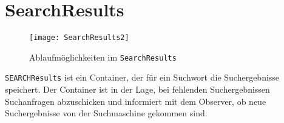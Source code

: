 
\section{SearchResults}
\begin{figure}[htb]
  \centering
  \texttt{[image: SearchResults2]}
  \caption{Ablaufmöglichkeiten im \lstinline|SearchResults|}
\end{figure}

\lstinline|SEARCHResults| ist ein Container, der für ein Suchwort die Suchergebnisse speichert.
Der Container ist in der Lage, bei fehlenden Suchergebnissen Suchanfragen abzuschicken und informiert mit dem Observer, ob neue Suchergebnisse von der Suchmaschine gekommen sind.
